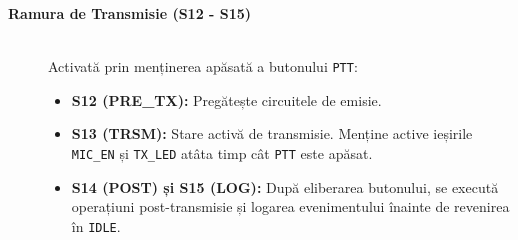 \begin{description}
    \item[\textbf{Ramura de Transmisie (S12 - S15)}] \hfill \\
    Activată prin menținerea apăsată a butonului \texttt{PTT}:
    \begin{itemize}
        \item \textbf{S12 (PRE\_TX):} Pregătește circuitele de emisie.
        \item \textbf{S13 (TRSM):} Stare activă de transmisie. Menține active ieșirile \texttt{MIC\_EN} și \texttt{TX\_LED} atâta timp cât \texttt{PTT} este apăsat.
        \item \textbf{S14 (POST) și S15 (LOG):} După eliberarea butonului, se execută operațiuni post-transmisie și logarea evenimentului înainte de revenirea în \texttt{IDLE}.
    \end{itemize}
\end{description}
